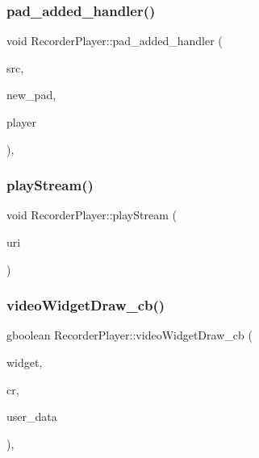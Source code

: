 \subsubsection{\texorpdfstring{pad\+\_\+added\+\_\+handler()}{pad\_added\_handler()}}
{\footnotesize\ttfamily void Recorder\+Player\+::pad\+\_\+added\+\_\+handler (\begin{DoxyParamCaption}\item[{Gst\+Element $\ast$}]{src,  }\item[{Gst\+Pad $\ast$}]{new\+\_\+pad,  }\item[{\hyperlink{class_recorder_player}{Recorder\+Player} $\ast$}]{player }\end{DoxyParamCaption})\hspace{0.3cm}{\ttfamily [static]}, {\ttfamily [private]}}

\mbox{\label{class_recorder_player_aa7f1f74d987ad24366fddb6444d82b63}} 
\subsubsection{\texorpdfstring{play\+Stream()}{playStream()}}
{\footnotesize\ttfamily void Recorder\+Player\+::play\+Stream (\begin{DoxyParamCaption}\item[{string}]{uri }\end{DoxyParamCaption})}

\mbox{\label{class_recorder_player_ad1bf2b3712c21b8d5c24f01b23a5c854}} 
\subsubsection{\texorpdfstring{video\+Widget\+Draw\+\_\+cb()}{videoWidgetDraw\_cb()}}
{\footnotesize\ttfamily gboolean Recorder\+Player\+::video\+Widget\+Draw\+\_\+cb (\begin{DoxyParamCaption}\item[{Gtk\+Widget $\ast$}]{widget,  }\item[{cairo\+\_\+t $\ast$}]{cr,  }\item[{gpointer}]{user\+\_\+data }\end{DoxyParamCaption})\hspace{0.3cm}{\ttfamily [static]}, {\ttfamily [private]}}

